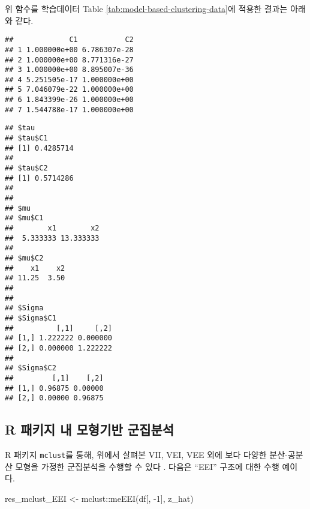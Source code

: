 \documentclass[
]{book}
\newenvironment{Shaded}{\begin{snugshade}}{\end{snugshade}}
\newcommand{\CommentTok}[1]{\textcolor[rgb]{0.56,0.35,0.01}{\textit{#1}}}
\newcommand{\DecValTok}[1]{\textcolor[rgb]{0.00,0.00,0.81}{#1}}
\newcommand{\FunctionTok}[1]{\textcolor[rgb]{0.00,0.00,0.00}{#1}}
\newcommand{\NormalTok}[1]{#1}
\newcommand{\OtherTok}[1]{\textcolor[rgb]{0.56,0.35,0.01}{#1}}
\newcommand{\SpecialCharTok}[1]{\textcolor[rgb]{0.00,0.00,0.00}{#1}}
\newcommand{\StringTok}[1]{\textcolor[rgb]{0.31,0.60,0.02}{#1}}
\begin{document}
위 함수를 학습데이터 Table \ref{tab:model-based-clustering-data}에 적용한 결과는 아래와 같다.

\begin{Shaded}
\end{Shaded}

\begin{verbatim}
##             C1           C2
## 1 1.000000e+00 6.786307e-28
## 2 1.000000e+00 8.771316e-27
## 3 1.000000e+00 8.895007e-36
## 4 5.251505e-17 1.000000e+00
## 5 7.046079e-22 1.000000e+00
## 6 1.843399e-26 1.000000e+00
## 7 1.544788e-17 1.000000e+00
\end{verbatim}

\begin{Shaded}
\end{Shaded}

\begin{verbatim}
## $tau
## $tau$C1
## [1] 0.4285714
## 
## $tau$C2
## [1] 0.5714286
## 
## 
## $mu
## $mu$C1
##        x1        x2 
##  5.333333 13.333333 
## 
## $mu$C2
##    x1    x2 
## 11.25  3.50 
## 
## 
## $Sigma
## $Sigma$C1
##          [,1]     [,2]
## [1,] 1.222222 0.000000
## [2,] 0.000000 1.222222
## 
## $Sigma$C2
##         [,1]    [,2]
## [1,] 0.96875 0.00000
## [2,] 0.00000 0.96875
\end{verbatim}

\hypertarget{r-packages-model-based-clustering}{%
\subsection{R 패키지 내 모형기반 군집분석}\label{r-packages-model-based-clustering}}

R 패키지 \texttt{mclust}를 통해, 위에서 살펴본 VII, VEI, VEE 외에 보다 다양한 분산-공분산 모형을 가정한 군집분석을 수행할 수 있다 \citep{scrucca2016mclust}. 다음은 ``EEI'' 구조에 대한 수행 예이다.

\begin{Shaded}
\begin{Highlighting}[]
\NormalTok{res\_mclust\_EEI }\OtherTok{\textless{}{-}}\NormalTok{ mclust}\SpecialCharTok{::}\FunctionTok{meEEI}\NormalTok{(df[, }\SpecialCharTok{{-}}\DecValTok{1}\NormalTok{], z\_hat)}
\end{Highlighting}
\end{Shaded}
\end{document}
